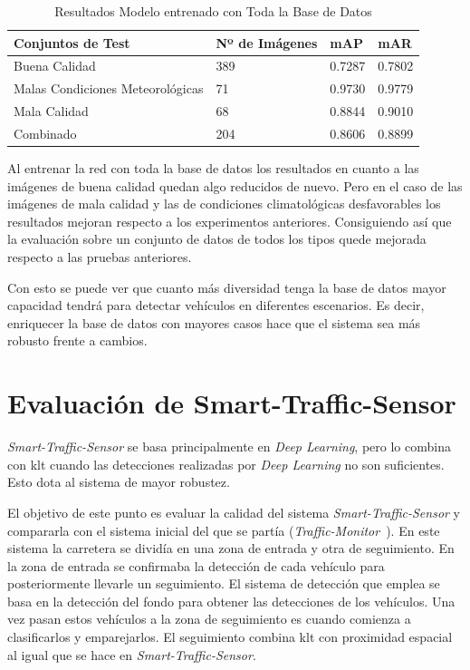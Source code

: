 \begin{table}[H] 
\begin{center}
\begin{tabular}{|l|l|l|l|}
\hline
 Conjuntos de Test & Nº de Imágenes & mAP & mAR  \\ 
\hline \hline
Buena Calidad & 389 & 0.7287 & 0.7802 \\ \hline
Malas Condiciones Meteorológicas & 71 & 0.9730 & 0.9779 \\ \hline
Mala Calidad  & 68 & 0.8844 & 0.9010\\ \hline
Combinado & 204 & 0.8606 & 0.8899\\ \hline
\end{tabular}
\caption{Resultados Modelo entrenado con Toda la Base de Datos}
\label{resultados_test_todas_img}
\end{center}
\end{table}

Al entrenar la red con toda la base de datos los resultados en cuanto a las imágenes de buena calidad quedan algo reducidos de nuevo. Pero en el caso de las imágenes de mala calidad y las de condiciones climatológicas desfavorables los resultados mejoran respecto  a los experimentos anteriores. Consiguiendo así que la evaluación sobre un conjunto de datos de todos los tipos quede mejorada respecto a las pruebas anteriores. 

Con esto se puede ver que cuanto más diversidad tenga la base de datos mayor capacidad tendrá para detectar vehículos en diferentes escenarios. Es decir, enriquecer la base de datos con mayores casos hace que el sistema sea más robusto frente a cambios. 

\section{Evaluación de Smart-Traffic-Sensor}

\textit{Smart-Traffic-Sensor} se basa principalmente en \textit{Deep Learning}, pero lo combina con \acrshort{klt} cuando las detecciones realizadas por \textit{Deep Learning} no son suficientes. Esto dota al sistema de mayor robustez. 

El objetivo de este punto es evaluar la calidad del sistema \textit{Smart-Traffic-Sensor} y compararla con el sistema inicial del que se partía (\textit{Traffic-Monitor}~\cite{redo_tesis}). En este sistema la carretera se dividía en una zona de entrada y otra de seguimiento. En la zona de entrada se confirmaba la detección de cada vehículo para posteriormente llevarle un seguimiento.  El sistema de detección que emplea se  basa en la detección del fondo para obtener las detecciones de los vehículos. Una vez pasan estos vehículos a la zona de seguimiento es cuando comienza a clasificarlos y emparejarlos. El seguimiento combina \acrshort{klt} con proximidad espacial al igual que se hace en \textit{Smart-Traffic-Sensor}.

